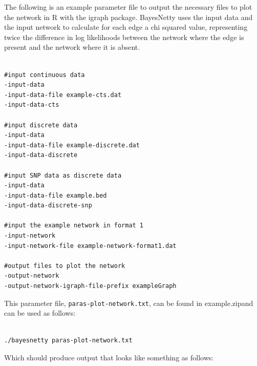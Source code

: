 \documentclass[a4paper,12pt]{article}
\newcommand{\code}[1]{{\footnotesize{{\tt #1}}}}
\begin{document}
The following is an example parameter file to output the necessary files to plot the network in R with the igraph package. BayesNetty uses the input data and the input network to calculate for each edge a chi squared value, representing twice the difference in log likelihoods between the network where the edge is present and the network where it is absent. 
\vspace{0.35cm} \begin{lstlisting}

#input continuous data
-input-data
-input-data-file example-cts.dat
-input-data-cts

#input discrete data
-input-data
-input-data-file example-discrete.dat
-input-data-discrete

#input SNP data as discrete data
-input-data
-input-data-file example.bed
-input-data-discrete-snp

#input the example network in format 1
-input-network
-input-network-file example-network-format1.dat

#output files to plot the network
-output-network
-output-network-igraph-file-prefix exampleGraph

\end{lstlisting} \vspace{0.35cm}
This parameter file, \code{paras-plot-network.txt}, can be found in example.zipand can be used as follows: 
\vspace{0.35cm} \begin{lstlisting}

./bayesnetty paras-plot-network.txt

\end{lstlisting} \vspace{0.35cm}
Which should produce output that looks like something as follows: 
\end{document}
